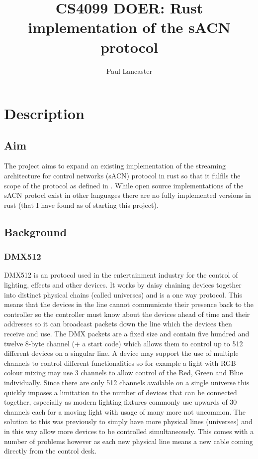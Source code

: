 \documentclass[12pt,a4paper,notitlepage]{report}
\author{Paul Lancaster}
\title{CS4099 DOER: Rust implementation of the sACN protocol}
\begin{document}
	\maketitle
\section*{Description}
\subsection*{Aim}
The project aims to expand an existing implementation \cite{ORIGNIAL_IMPL} of the streaming architecture for control networks (sACN) protocol \cite{ANSI_E1.17} in rust so that it fulfils the scope of the protocol as defined in \cite{ANSI_E1.31}. While open source implementations of the sACN protocl exist in other languages \cite{C_IMPL} there are no fully implemented versions in rust (that I have found as of starting this project). 
\subsection*{Background}
\subsubsection*{DMX512} DMX512 is an protocol used in the entertainment industry for the control of lighting, effects and other devices. It works by daisy chaining devices together into distinct physical chains (called universes) and is a one way protocol. This means that the devices in the line cannot communicate their presence back to the controller so the controller must know about the devices ahead of time and their addresses so it can broadcast packets down the line which the devices then receive and use. The DMX packets are a fixed size and contain five hundred and twelve 8-byte channel (+ a start code) which allows them to control up to 512 different devices on a singular line. A device may support the use of multiple channels to control different functionalities so for example a light with RGB colour mixing may use 3 channels to allow control of the Red, Green and Blue individually. Since there are only 512 channels available on a single universe this quickly imposes a limitation to the number of devices that can be connected together, especially as modern lighting fixtures commonly use upwards of 30 channels each for a moving light with usage of many more not uncommon. The solution to this was previously to simply have more physical lines (universes) and in this way allow more devices to be controlled simultaneously. This comes with a number of problems however as each new physical line means a new cable coming directly from the control desk.
\end{document}
